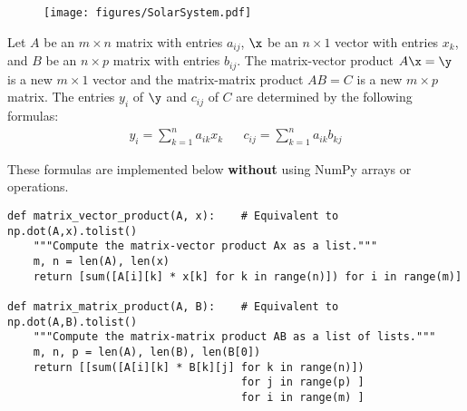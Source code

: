 \begin{figure}[H]
    \texttt{[image: figures/SolarSystem.pdf]}
\end{figure}

\label{prob:solar-system-trajectories}
Let $A$ be an $m \times n$ matrix with entries $a_{ij}$, $\x$ be an $n \times 1$ vector with entries $x_k$, and $B$ be an $n \times p$ matrix with entries $b_{ij}$.
%
%
The matrix-vector product $A\x = \y$ is a new $m \times 1$ vector and the matrix-matrix product $AB = C$ is a new $m \times p$ matrix.
The entries $y_i$ of $\y$ and $c_{ij}$ of $C$ are determined by the following formulas:
%
\begin{align*}
y_i = \sum_{k=1}^n a_{ik}x_k%
&&
c_{ij} = \sum_{k=1}^n a_{ik}b_{kj}%
\end{align*}

These formulas are implemented below \textbf{without} using NumPy arrays or operations.

\begin{lstlisting}
def matrix_vector_product(A, x):    # Equivalent to np.dot(A,x).tolist()
    """Compute the matrix-vector product Ax as a list."""
    m, n = len(A), len(x)
    return [sum([A[i][k] * x[k] for k in range(n)]) for i in range(m)]

def matrix_matrix_product(A, B):    # Equivalent to np.dot(A,B).tolist()
    """Compute the matrix-matrix product AB as a list of lists."""
    m, n, p = len(A), len(B), len(B[0])
    return [[sum([A[i][k] * B[k][j] for k in range(n)])
                                    for j in range(p) ]
                                    for i in range(m) ]
\end{lstlisting}

